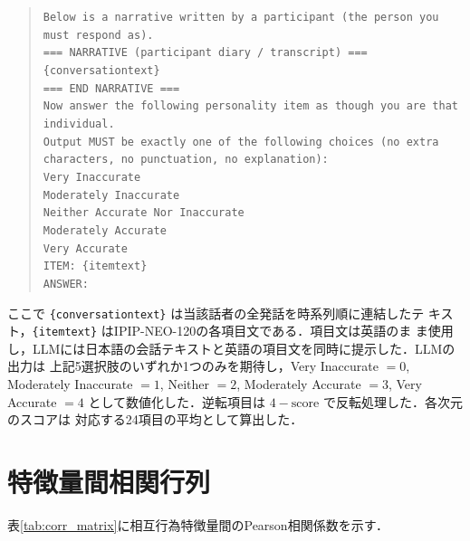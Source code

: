 \documentclass[dvipdfmx,11pt,a4paper]{bxjsarticle}
\renewcommand{\_}{\paperorigunderscore\allowbreak}%
\begin{document}
\begin{quote}
\small
\texttt{Below is a narrative written by a participant (the person you must respond as).}\\[4pt]
\texttt{=== NARRATIVE (participant diary / transcript) ===}\\
\texttt{\{conversation\_text\}}\\
\texttt{=== END NARRATIVE ===}\\[4pt]
\texttt{Now answer the following personality item as though you are that individual.}\\
\texttt{Output MUST be exactly one of the following choices (no extra characters, no punctuation, no explanation):}\\
\texttt{Very Inaccurate}\\
\texttt{Moderately Inaccurate}\\
\texttt{Neither Accurate Nor Inaccurate}\\
\texttt{Moderately Accurate}\\
\texttt{Very Accurate}\\[4pt]
\texttt{ITEM: \{item\_text\}}\\
\texttt{ANSWER:}
\end{quote}

ここで \texttt{\{conversation\_text\}} は当該話者の全発話を時系列順に連結したテ
キスト，\texttt{\{item\_text\}} はIPIP-NEO-120の各項目文である．項目文は英語のま
ま使用し，LLMには日本語の会話テキストと英語の項目文を同時に提示した．LLMの出力は
上記5選択肢のいずれか1つのみを期待し，Very Inaccurate $= 0$, Moderately
Inaccurate $= 1$, Neither $= 2$, Moderately Accurate $= 3$, Very Accurate $= 4$
として数値化した．逆転項目は $4 - \text{score}$ で反転処理した．各次元のスコアは
対応する24項目の平均として算出した．





\section{特徴量間相関行列}
\label{sec:supp_corr}
表\ref{tab:corr_matrix}に相互行為特徴量間のPearson相関係数を示す．

\begin{table}[htbp]
\centering
\caption{相互行為特徴量間のPearson相関行列．}
\label{tab:corr_matrix}

\end{table}
\end{document}
